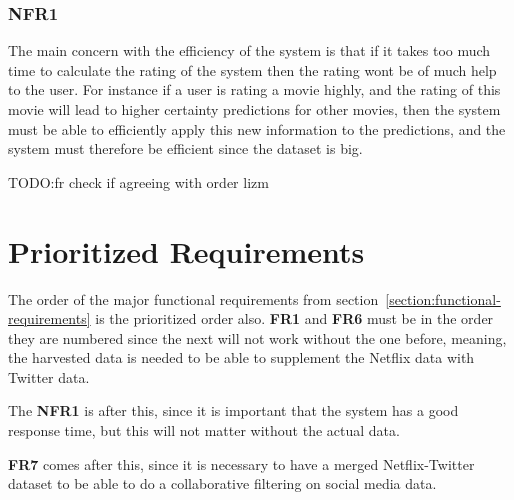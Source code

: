 \subsubsection{NFR1}
The main concern with the efficiency of the system is that if it takes too much time to calculate the rating of the system then the rating wont be of much help to the user. For instance if a user is rating a movie highly, and the rating of this movie will lead to higher certainty predictions for other movies, then the system must be able to efficiently apply this new information to the predictions, and the system must therefore be efficient since the dataset is big.


TODO:fr check if agreeing with order lizm
\section{Prioritized Requirements}
The order of the major functional requirements from section~\ref{section:functional-requirements} is the prioritized order also. \textbf{FR1} and \textbf{FR6} must be in the order they are numbered since the next will not work without the one before, meaning, the harvested data is needed to be able to supplement the Netflix data with Twitter data.

The \textbf{NFR1} is after this, since it is important that the system has a good response time, but this will not matter without the actual data.

\textbf{FR7} comes after this, since it is necessary to have a merged Netflix-Twitter dataset to be able to do a collaborative filtering on social media data.
